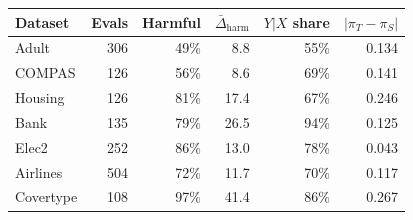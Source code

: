 \begin{tabular}{lrrrrr}
\toprule
Dataset & Evals & Harmful & $\bar\Delta_{\text{harm}}$ & $Y|X$ share & $|\pi_T-\pi_S|$ \\
\midrule
Adult & 306 & 49\% & 8.8 & 55\% & 0.134 \\
COMPAS & 126 & 56\% & 8.6 & 69\% & 0.141 \\
Housing & 126 & 81\% & 17.4 & 67\% & 0.246 \\
Bank & 135 & 79\% & 26.5 & 94\% & 0.125 \\
Elec2 & 252 & 86\% & 13.0 & 78\% & 0.043 \\
Airlines & 504 & 72\% & 11.7 & 70\% & 0.117 \\
Covertype & 108 & 97\% & 41.4 & 86\% & 0.267 \\
\bottomrule
\end{tabular}